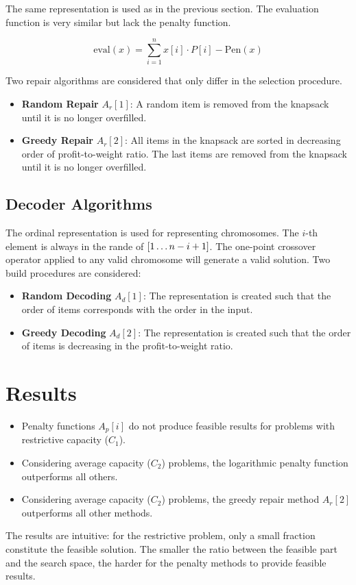 \documentclass[../main.tex]{subfiles}
\begin{document}
The same representation is used as in the previous section. The evaluation function is very similar but lack the
penalty function.

\begin{equation}
\text{eval}(x) = \sum^n_{i=1} x[i] \cdot P[i] - \text{Pen}(x)
\end{equation}

Two repair algorithms are considered that only differ in the selection procedure.

\begin{itemize}
	\item \textbf{Random Repair} $A_r[1]$: A random item is removed from the knapsack until it is no longer overfilled.
	\item \textbf{Greedy Repair} $A_r[2]$: All items in the knapsack are sorted in decreasing order of profit-to-weight
	ratio. The last items are removed from the knapsack until it is no longer overfilled.
\end{itemize}

\subsection{Decoder Algorithms}

The ordinal representation is used for representing chromosomes. The $i$-th element is always in the rande of $[1
\mathellipsis n - i + 1]$. The one-point crossover operator applied to any valid chromosome will generate a valid
solution. Two build procedures are considered:

\begin{itemize}
	\item \textbf{Random Decoding} $A_d[1]$: The representation is created such that the order of items corresponds
	with the order in the input.
	\item \textbf{Greedy Decoding} $A_d[2]$: The representation is created such that the order of items is decreasing
	in the profit-to-weight ratio.
\end{itemize}

\section{Results}

\begin{itemize}
	\item Penalty functions $A_p[i]$ do not produce feasible results for problems with restrictive capacity ($C_1$).
	\item Considering average capacity ($C_2$) problems, the logarithmic penalty function outperforms all others.
	\item Considering average capacity ($C_2$) problems, the greedy repair method $A_r[2]$ outperforms all other
	methods.
\end{itemize}

The results are intuitive: for the restrictive problem, only a small fraction constitute the feasible solution. The
smaller the ratio between the feasible part and the search space, the harder for the penalty methods to provide
feasible results.
\end{document}
